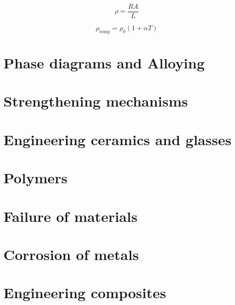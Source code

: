 \documentclass[12pt]{article}
\begin{document}
\begin{equation*}
  \rho = \frac{RA}{L}
\end{equation*}

\begin{equation*}
  \rho_{\text{temp}} = \rho_0 (1+\alpha T)
\end{equation*}

\section{Phase diagrams and Alloying}
\section{Strengthening mechanisms}
\section{Engineering ceramics and glasses}
\section{Polymers}
\section{Failure of materials}
\section{Corrosion of metals}
\section{Engineering composites}
\end{document}
